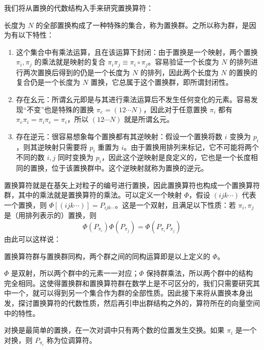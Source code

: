 \documentclass[cn,10pt,math=newtx,citestyle=gb7714-2015,bibstyle=gb7714-2015]{elegantbook}
\begin{document}
我们将从置换的代数结构入手来研究置换算符：
\begin{definition}[置换群]
    长度为 $N$ 的全部置换构成了一种特殊的集合，称为置换群。之所以称为群，是因为有以下特性：
    \begin{enumerate}
        \item 这个集合中有乘法运算，且在该运算下封闭：由于置换是一个映射，两个置换 $\pi_i,\pi_j$ 的乘法就是映射的复合 $\pi_i\pi_j\equiv\pi_i\circ\pi_j$。容易验证一个长度为 $N$ 的排列进行两次置换后得到的仍是一个长度为 $N$ 的排列，因此两个长度为 $N$ 的置换的复合仍是一个长度为 $N$ 置换，它总属于这个置换群，即所谓封闭性。
        \item 存在幺元：所谓幺元即是与其进行乘法运算后不发生任何变化的元素。容易发现“不变”也是特殊的置换 $\pi_e =(12\cdots N)$，因此对于任意置换 $\pi_i$ 都有 $\pi_e\pi_i=\pi_i\pi_e=\pi_i$，所以 $(12\cdots N)$ 就是所谓幺元。
        \item 存在逆元：很容易想象每个置换都有其逆映射：假设一个置换将数 $i$ 变换为 $p_i$，则其逆映射只需要将 $p_i$ 重置为 $i$。由于置换用排列来标记，它不可能将两个不同的数 $i,j$ 同时变换为 $p_i$，因此这个逆映射是良定义的，它也是一个长度相同的置换，位于该置换群中。这个逆映射就称为置换的逆元。
    \end{enumerate}
\end{definition}

置换算符就是在基矢上对粒子的编号进行置换，因此置换算符也构成一个置换算符群，其中的乘法就是置换算符的乘法。可以定义一个映射 $\Phi$，假设 $(ijk\cdots)$ 代表一个置换，则 $\Phi[(ijk\cdots)] = P_{ijk\cdots}$。这是一个双射，且满足以下性质：若 $\pi_i,\pi_j$ 是（用排列表示的）置换，则
\begin{equation}
    \Phi(P_{\pi_i})\Phi(P_{\pi_j}) = \Phi(P_{\pi_i}P_{\pi_j})
\end{equation}
由此可以这样说：
\begin{lemma}[置换算符群与置换群的关系]
    置换算符群与置换群同构，两个群之间的同构运算即是以上定义的 $\Phi$。
\end{lemma}

$\Phi$ 是双射，所以两个群中的元素一一对应；$\Phi$ 保持群乘法，所以两个群中的结构完全相同。这使得置换群和置换算符群在数学上是不可区分的，我们只需要研究其中一个，就可以得到另一个集合作为群的全部性质。因此接下来将从置换本身出发，探讨置换算符的代数性质，然后再引申出群结构之外的，算符所在的向量空间中的特性。

\begin{definition}[对换与位调算符]
    对换是最简单的置换，在一次对调中只有两个数的位置发生交换。如果 $\pi_i$ 是一个对换，则 $P_{\pi_i}$ 称为位调算符。
\end{definition}
\end{document}
